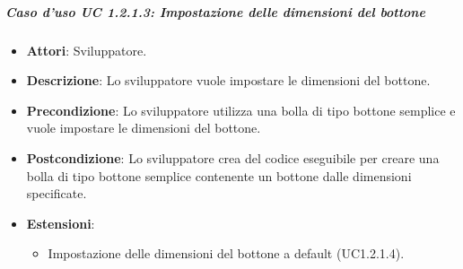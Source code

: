 \subparagraph{Caso d'uso UC 1.2.1.3: Impostazione delle dimensioni del bottone}

\FloatBarrier
\begin{itemize}
\item\textbf{Attori}: Sviluppatore.
\item\textbf{Descrizione}: Lo sviluppatore vuole impostare le dimensioni del bottone.
\item\textbf{Precondizione}: Lo sviluppatore utilizza una bolla di tipo bottone semplice e vuole impostare le dimensioni del bottone.
\item\textbf{Postcondizione}: Lo sviluppatore crea del codice eseguibile per creare una bolla di tipo bottone semplice contenente un bottone dalle dimensioni specificate.
\item \textbf{Estensioni}: 
\begin{itemize}
\item Impostazione delle dimensioni del bottone a default (UC1.2.1.4).
\end{itemize}
\end{itemize}